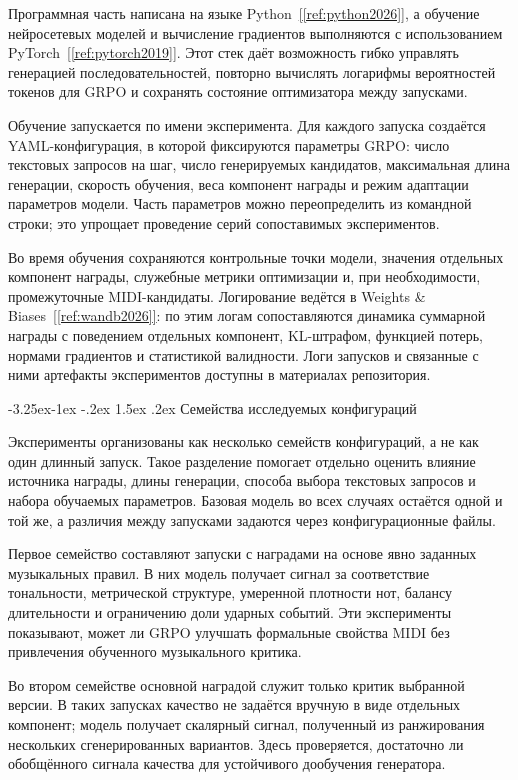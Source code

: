 \documentclass[a4paper,12pt]{extarticle}
\makeatletter
\newcommand{\sourcecite}[1]{\hyperref[#1]{[\ref*{#1}]}}
\renewcommand\subsection{\@startsection{subsection}{2}{\z@}%
  {-3.25ex\@plus -1ex \@minus -.2ex}%
  {1.5ex \@plus .2ex}%
  {\normalfont\large\bfseries\Needspace{6\baselineskip}}}
\makeatother
\begin{document}
Программная часть написана на языке Python~\sourcecite{ref:python2026}, а
обучение нейросетевых моделей и вычисление градиентов выполняются с
использованием PyTorch~\sourcecite{ref:pytorch2019}. Этот стек даёт возможность гибко
управлять генерацией последовательностей, повторно
вычислять логарифмы вероятностей токенов для GRPO и сохранять состояние
оптимизатора между запусками.

Обучение запускается по имени эксперимента. Для каждого запуска
создаётся YAML-конфигурация, в которой фиксируются параметры GRPO:
число текстовых запросов на шаг, число генерируемых кандидатов,
максимальная длина генерации, скорость обучения, веса компонент награды и
режим адаптации параметров модели. Часть параметров можно переопределить
из командной строки; это упрощает проведение серий
сопоставимых экспериментов.

Во время обучения сохраняются контрольные точки модели, значения
отдельных компонент награды, служебные метрики оптимизации и,
при необходимости, промежуточные MIDI-кандидаты. Логирование ведётся в
Weights \& Biases~\sourcecite{ref:wandb2026}: по этим логам сопоставляются динамика суммарной награды
с поведением отдельных компонент, KL-штрафом, функцией потерь, нормами градиентов
и статистикой валидности. Логи запусков и связанные с ними артефакты
экспериментов доступны в материалах репозитория.

\subsection{Семейства исследуемых конфигураций}

Эксперименты организованы как несколько семейств конфигураций, а не как один
длинный запуск. Такое разделение помогает отдельно оценить влияние источника
награды, длины генерации, способа выбора текстовых запросов и набора обучаемых
параметров. Базовая модель во всех случаях остаётся одной и той же, а различия
между запусками задаются через конфигурационные файлы.

Первое семейство составляют запуски с наградами на основе явно заданных
музыкальных правил. В них модель получает сигнал за соответствие тональности,
метрической структуре, умеренной плотности нот, балансу длительности и
ограничению доли ударных событий. Эти эксперименты показывают, может ли GRPO
улучшать формальные свойства MIDI без привлечения обученного музыкального
критика.

Во втором семействе основной наградой служит только критик выбранной версии.
В таких запусках качество не задаётся вручную в виде отдельных
компонент; модель получает скалярный сигнал, полученный из ранжирования
нескольких сгенерированных вариантов. Здесь проверяется, достаточно ли
обобщённого сигнала качества для устойчивого дообучения генератора.
\end{document}
